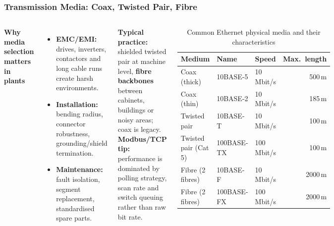 \begin{frame}
	\frametitle{Transmission Media: Coax, Twisted Pair, Fibre}
	\begin{columns}[T,onlytextwidth]
		\footnotesize
		\textbf{Why media selection matters in plants}
		\begin{itemize}
			\item \textbf{EMC/EMI:} drives, inverters, contactors and long cable runs create harsh environments.
			\item \textbf{Installation:} bending radius, connector robustness, grounding/shield termination.
			\item \textbf{Maintenance:} fault isolation, segment replacement, standardised spare parts.
		\end{itemize}
		\textbf{Typical practice:} shielded twisted pair at machine level, \textbf{fibre backbones} between cabinets, buildings or noisy areas; coax is legacy.\\[1mm]
		\textbf{Modbus/TCP tip:} performance is dominated by polling strategy, scan rate and switch queuing rather than raw bit rate.
		\scriptsize
		\begin{table}
			\begin{tabular}{@{}lllr@{}}
				\toprule
				\textbf{Medium} & \textbf{Name} & \textbf{Speed} & \textbf{Max.\ length}\\
				\midrule
				Coax (thick)  & 10BASE-5   & 10\,Mbit/s  & 500\,m\\
				Coax (thin)   & 10BASE-2   & 10\,Mbit/s  & 185\,m\\
				Twisted pair  & 10BASE-T   & 10\,Mbit/s  & 100\,m\\
				Twisted pair (Cat 5) & 100BASE-TX & 100\,Mbit/s & 100\,m\\
				Fibre (2 fibres) & 10BASE-F   & 10\,Mbit/s  & 2000\,m\\
				Fibre (2 fibres) & 100BASE-FX & 100\,Mbit/s & 2000\,m\\
				\bottomrule
			\end{tabular}
			\caption{Common Ethernet physical media and their characteristics}
			\label{tab:ethernet_media}
		\end{table}
	\end{columns}
\end{frame}

